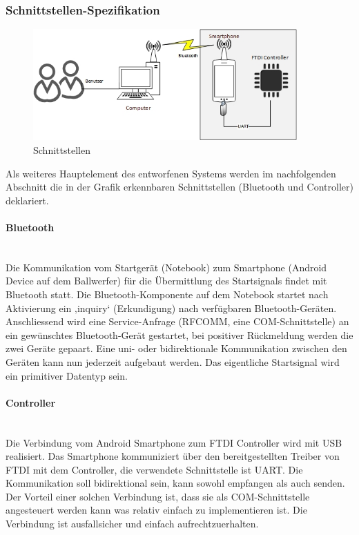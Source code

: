 	\subsubsection{Schnittstellen-Spezifikation}
		\begin{figure}[h!]
			\centering
			\includegraphics[width=0.9\textwidth]{Enddokumentation/Loesungskonzept/Bilder/Schnittstellen.jpg}
			\caption{Schnittstellen}		
		\end{figure}
		Als weiteres Hauptelement des entworfenen Systems werden im nachfolgenden Abschnitt die in der Grafik erkennbaren Schnittstellen (Bluetooth und Controller) deklariert.
		
		\paragraph{Bluetooth}$~~$\vspace{2mm}\\
		Die Kommunikation vom Startgerät (Notebook) zum Smartphone (Android Device auf dem Ballwerfer) für die Übermittlung des Startsignals findet mit Bluetooth statt. Die Bluetooth-Komponente auf dem Notebook startet nach Aktivierung ein ‚inquiry‘ (Erkundigung) nach verfügbaren Bluetooth-Geräten. Anschliessend wird eine Service-Anfrage (RFCOMM, eine COM-Schnittstelle) an ein gewünschtes Bluetooth-Gerät gestartet, bei positiver Rückmeldung werden die zwei Geräte gepaart. Eine uni- oder bidirektionale Kommunikation zwischen den Geräten kann nun jederzeit aufgebaut werden. Das eigentliche Startsignal wird ein primitiver Datentyp sein.
		
		\paragraph{Controller}$~~$\vspace{2mm}\\
		Die Verbindung vom Android Smartphone zum FTDI Controller wird mit USB realisiert. 
		Das Smartphone kommuniziert über den bereitgestellten Treiber von FTDI mit dem Controller, die verwendete Schnittstelle ist UART. Die Kommunikation soll bidirektional sein, kann sowohl empfangen als auch senden. Der Vorteil einer solchen Verbindung ist, dass sie als COM-Schnittstelle angesteuert werden kann was relativ einfach zu implementieren ist. Die Verbindung ist ausfallsicher und einfach aufrechtzuerhalten.		
		
